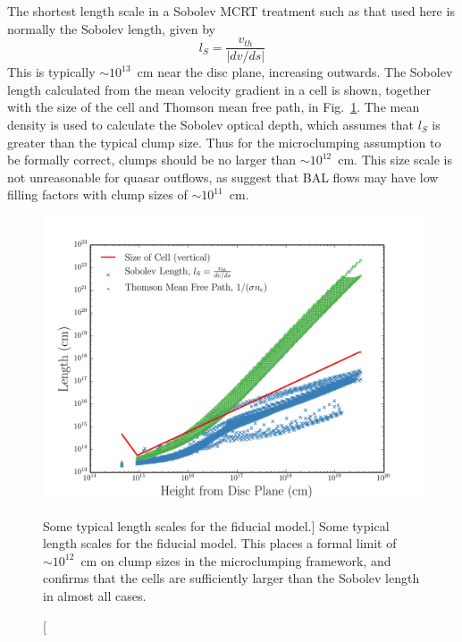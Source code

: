 The shortest length scale in a Sobolev MCRT treatment such as that used here
is normally the Sobolev length, given by
\begin{equation}
l_S = \frac{v_{th}}{| dv/ds |}
\end{equation}
This is typically $\sim10^{13}$~cm near the disc plane, increasing outwards.
The Sobolev length calculated from the mean velocity gradient in a cell
is shown, together with the size of the cell
and Thomson mean free path, in Fig.~\ref{fig:length_scales}.
The mean density is used to calculate the Sobolev optical depth, 
which assumes that $l_S$ is greater than the typical clump size.
Thus for the microclumping assumption to be formally correct, 
clumps should be no larger than $\sim10^{12}$~cm.
This size scale is not unreasonable for quasar outflows, as
\cite{dekool1995} suggest that BAL flows may have low filling factors with
clump sizes of $\sim10^{11}$~cm.
\begin{figure} 
\centering
\includegraphics[width=1.0\textwidth]{figures/06-agnpaper/size_of_clumps.png}
\caption
[Some typical length scales for the fiducial model.]
{
Some typical length scales for the fiducial model. 
This places a formal limit of $\sim10^{12}$~cm on clump sizes 
in the microclumping framework, and confirms that the cells are sufficiently
larger than the Sobolev length in almost all cases.
}
\label{fig:length_scales}
\end{figure} 

